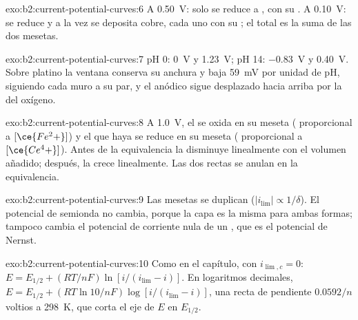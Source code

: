 \begin{solution}{exo:b2:current-potential-curves:6}
A \qty{0.50}{V}: solo se reduce  a , con su .
A \qty{0.10}{V}: se reduce  y a la vez se deposita cobre,
cada uno con su ; el total es la suma de las dos mesetas.
\end{solution}

\begin{solution}{exo:b2:current-potential-curves:7}
pH 0: \qty{0}{V} y \qty{1.23}{V}; pH 14: \qty{-0.83}{V} y \qty{0.40}{V}. Sobre
platino la ventana conserva su anchura y baja \qty{59}{mV} por unidad de pH,
siguiendo cada muro a su par, y el anódico sigue desplazado hacia arriba por la
 del oxígeno.
\end{solution}

\begin{solution}{exo:b2:current-potential-curves:8}
A \qty{1.0}{V}, el  se oxida en su meseta (
proporcional a $[\ce{Fe^2+}]$) y el  que haya se reduce en su meseta
( proporcional a $[\ce{Ce^4+}]$). Antes de la equivalencia la
 disminuye linealmente con el volumen añadido; después, la  crece linealmente. Las dos rectas se anulan en la equivalencia.
\end{solution}

\begin{solution}{exo:b2:current-potential-curves:9}
Las mesetas se duplican ($|i_{\lim}| \propto 1/\delta$). El potencial de semionda no
cambia, porque la capa es la misma para ambas formas; tampoco cambia el potencial de corriente
nula de un , que es el potencial de Nernst.
\end{solution}

\begin{solution}{exo:b2:current-potential-curves:10}
Como en el capítulo, con $i_{\lim,c} = 0$: $E = E_{1/2} + (RT/nF)\ln[i/(i_{\lim} -
i)]$. En logaritmos decimales, $E = E_{1/2} + (RT\ln 10/nF)\log[i/(i_{\lim} - i)]$,
una recta de pendiente $0.0592/n$ voltios a \qty{298}{K}, que corta el
eje de $E$ en $E_{1/2}$.
\end{solution}

